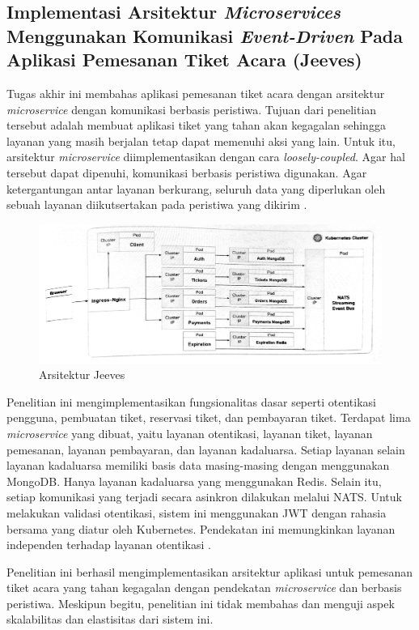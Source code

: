 \subsection{Implementasi Arsitektur \textit{Microservices} Menggunakan Komunikasi \textit{Event-Driven} Pada Aplikasi Pemesanan Tiket Acara (Jeeves)}

Tugas akhir ini membahas aplikasi pemesanan tiket acara dengan arsitektur \textit{microservice} dengan komunikasi berbasis peristiwa. Tujuan dari penelitian tersebut adalah membuat aplikasi tiket yang tahan akan kegagalan sehingga layanan yang masih berjalan tetap dapat memenuhi aksi yang lain. Untuk itu, arsitektur \textit{microservice} diimplementasikan dengan cara \textit{loosely-coupled}. Agar hal tersebut dapat dipenuhi, komunikasi berbasis peristiwa digunakan. Agar ketergantungan antar layanan berkurang, seluruh data yang diperlukan oleh sebuah layanan diikutsertakan pada peristiwa yang dikirim \parencite{microservicesEventDriven}.

\begin{figure}[htbp]
    \centering
    \includegraphics[width=1\textwidth]{resources/chapter-2/jeeves.png}
    \caption{Arsitektur Jeeves \parencite{microservicesEventDriven}}
    \label{fig:jeeves-architecture}
\end{figure}

Penelitian ini mengimplementasikan fungsionalitas dasar seperti otentikasi pengguna, pembuatan tiket, reservasi tiket, dan pembayaran tiket. Terdapat lima \textit{microservice} yang dibuat, yaitu layanan otentikasi, layanan tiket, layanan pemesanan, layanan pembayaran, dan layanan kadaluarsa. Setiap layanan selain layanan kadaluarsa memiliki basis data masing-masing dengan menggunakan MongoDB. Hanya layanan kadaluarsa yang menggunakan Redis. Selain itu, setiap komunikasi yang terjadi secara asinkron dilakukan melalui NATS. Untuk melakukan validasi otentikasi, sistem ini menggunakan JWT dengan rahasia bersama yang diatur oleh Kubernetes. Pendekatan ini memungkinkan layanan independen terhadap layanan otentikasi \parencite{microservicesEventDriven}.

Penelitian ini berhasil mengimplementasikan arsitektur aplikasi untuk pemesanan tiket acara yang tahan kegagalan dengan pendekatan \textit{microservice} dan berbasis peristiwa. Meskipun begitu, penelitian ini tidak membahas dan menguji aspek skalabilitas dan elastisitas dari sistem ini.